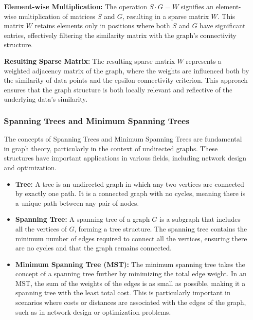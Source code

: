 \documentclass[unicode,11pt,a4paper,oneside,numbers=endperiod,openany]{scrartcl}
\begin{document}
\textbf{Element-wise Multiplication:}
The operation \( S \cdot G = W \) signifies an element-wise multiplication of matrices \( S \) and \( G \), resulting in a sparse matrix \( W \). This matrix \( W \) retains elements only in positions where both \( S \) and \( G \) have significant entries, effectively filtering the similarity matrix with the graph's connectivity structure.

\textbf{Resulting Sparse Matrix:}
The resulting sparse matrix \( W \) represents a weighted adjacency matrix of the graph, where the weights are influenced both by the similarity of data points and the epsilon-connectivity criterion. This approach ensures that the graph structure is both locally relevant and reflective of the underlying data's similarity.


\subsubsection{Spanning Trees and Minimum Spanning Trees}

The concepts of Spanning Trees and Minimum Spanning Trees are fundamental in graph theory, particularly in the context of undirected graphs. These structures have important applications in various fields, including network design and optimization.

\begin{itemize}
    \item \textbf{Tree:} A tree is an undirected graph in which any two vertices are connected by exactly one path. It is a connected graph with no cycles, meaning there is a unique path between any pair of nodes.

    \item \textbf{Spanning Tree:} A spanning tree of a graph \( G \) is a subgraph that includes all the vertices of \( G \), forming a tree structure. The spanning tree contains the minimum number of edges required to connect all the vertices, ensuring there are no cycles and that the graph remains connected.

    \item \textbf{Minimum Spanning Tree (MST):} The minimum spanning tree takes the concept of a spanning tree further by minimizing the total edge weight. In an MST, the sum of the weights of the edges is as small as possible, making it a spanning tree with the least total cost. This is particularly important in scenarios where costs or distances are associated with the edges of the graph, such as in network design or optimization problems.
\end{itemize}
\end{document}
